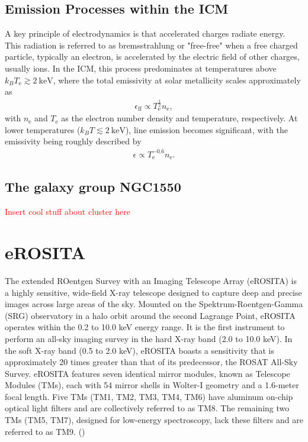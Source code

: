 \subsection{Emission Processes within the ICM} 
A key principle of electrodynamics is that accelerated charges radiate energy. This radiation is referred to as bremsstrahlung or "free-free" when a free charged particle, typically an electron, is accelerated by the electric field of other charges, usually ions. In the ICM, this process predominates at temperatures above \(k_B T_\text{e} \gtrsim \SI{2}{\kilo\electronvolt}\), where the total emissivity at solar metallicity scales approximately as 
\begin{align*}
    \epsilon_{\text{ff}} \propto T_\text{e}^{\frac{1}{2}} n_\text{e},
\end{align*}
with \(n_\text{e}\) and \(T_\text{e}\) as the electron number density and temperature, respectively. At lower temperatures (\(k_B T \lesssim \SI{2}{\kilo\electronvolt}\)), line emission becomes significant, with the emissivity being roughly described by 
\begin{align*}
    \epsilon \propto T_\text{e}^{-0.6} n_\text{e}.
\end{align*}
%
\subsection{The galaxy group NGC1550}
\textcolor{red}{Insert cool stuff about cluster here}
%
\section{eROSITA}
The extended ROentgen Survey with an Imaging Telescope Array (eROSITA) is a highly sensitive, wide-field X-ray telescope designed to capture deep and precise images across large areas of the sky. Mounted on the Spektrum-Roentgen-Gamma (SRG) observatory in a halo orbit around the second Lagrange Point, eROSITA operates within the 0.2 to 10.0 keV energy range. It is the first instrument to perform an all-sky imaging survey in the hard X-ray band (2.0 to 10.0 keV). In the soft X-ray band (0.5 to 2.0 keV), eROSITA boasts a sensitivity that is approximately 20 times greater than that of its predecessor, the ROSAT All-Sky Survey. eROSITA features seven identical mirror modules, known as Telescope Modules (TMs), each with 54 mirror shells in Wolter-I geometry and a 1.6-meter focal length. Five TMs (TM1, TM2, TM3, TM4, TM6) have aluminum on-chip optical light filters and are collectively referred to as TM8. The remaining two TMs (TM5, TM7), designed for low-energy spectroscopy, lack these filters and are referred to as TM9. (\cite{Predehl2021})

